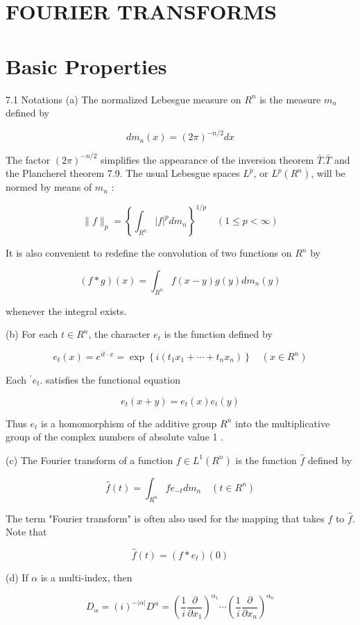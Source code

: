 \documentclass[10pt]{article}
\begin{document}
\section{FOURIER TRANSFORMS}
\section{Basic Properties}
7.1 Notations (a) The normalized Lebesgue measure on $R^{n}$ is the measure $m_{n}$ defined by

$$
d m_{n}(x)=(2 \pi)^{-n / 2} d x
$$

The factor $(2 \pi)^{-n / 2}$ simplifies the appearance of the inversion theorem $\bar{T} . \bar{T}$ and the Plancherel theorem 7.9. The usual Lebesgue spaces $L^{p}$, or $L^{p}\left(R^{n}\right)$, will be normed by means of $m_{n}$ :

$$
\|f\|_{p}=\left\{\int_{R^{n}}|f|^{p} d m_{n}\right\}^{1 / p} \quad(1 \leq p<\infty)
$$

It is also convenient to redefine the convolution of two functions on $R^{n}$ by

$$
(f * g)(x)=\int_{R^{n}} f(x-y) g(y) d m_{n}(y)
$$

whenever the integral exists.

(b) For each $t \in R^{n}$, the character $e_{t}$ is the function defined by

$$
e_{t}(x)=e^{i t \cdot x}=\exp \left\{i\left(t_{1} x_{1}+\cdots+t_{n} x_{n}\right)\right\} \quad\left(x \in R^{n}\right)
$$

Each $^{\prime} e_{t}$. satisfies the functional equation

$$
e_{t}(x+y)=e_{t}(x) e_{t}(y)
$$

Thus $e_{t}$ is a homomorphism of the additive group $R^{n}$ into the multiplicative group of the complex numbers of absolute value 1 .

(c) The Fourier transform of a function $f \in L^{1}\left(R^{n}\right)$ is the function $\hat{f}$ defined by

$$
\hat{f}(t)=\int_{R^{n}} f e_{-t} d m_{n} \quad\left(t \in R^{n}\right)
$$

The term "Fourier transform" is often also used for the mapping that takes $f$ to $\hat{f}$. Note that

$$
\hat{f}(t)=\left(f * e_{t}\right)(0)
$$

(d) If $\alpha$ is a multi-index, then

$$
D_{\alpha}=(i)^{-|\alpha|} D^{\alpha}=\left(\frac{1}{i} \frac{\partial}{\partial x_{1}}\right)^{\alpha_{1}} \cdots\left(\frac{1}{i} \frac{\partial}{\partial x_{n}}\right)^{\alpha_{n}}
$$
\end{document}

